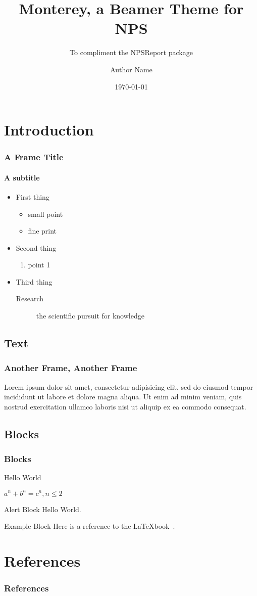 \documentclass{beamer}
\title{Monterey, a Beamer Theme for NPS}
\subtitle{To compliment the NPSReport package}
\author{Author Name}
\date{\today}
\institute[\sc www.nps.edu]{Naval Postgraduate School}
\begin{document}
\begin{frame}[plain,t]
\titlepage
\end{frame}


\section{Introduction}
\begin{frame}
\frametitle{A Frame Title}
\framesubtitle{A subtitle}
\begin{itemize}
\item First thing
	\begin{itemize}
	\item small point
	\item fine print
	\end{itemize}
\item Second thing
	\begin{enumerate}
	\item point 1
	\end{enumerate}
\item Third thing
	\begin{description}
	\item[Research] the scientific pursuit for knowledge
	\end{description}
\end{itemize}
\end{frame}


\subsection{Text}
\begin{frame}
\frametitle{Another Frame, Another Frame}
Lorem ipsum dolor sit amet, consectetur adipisicing elit, sed do eiusmod tempor incididunt ut labore et dolore magna aliqua. Ut enim ad minim veniam, quis nostrud exercitation ullamco laboris nisi ut aliquip ex ea commodo consequat.
\end{frame}



\subsection{Blocks}
\begin{frame}
\frametitle{Blocks}
\begin{definition}[Greetings]
Hello World
\end{definition}

\begin{theorem}[Theorem]
$a^n + b^n = c^n, n \leq 2$
\end{theorem}

\begin{alertblock}{Alert Block}
Hello World.
\end{alertblock}

\begin{exampleblock}{Example Block}
Here is a reference to the \LaTeX book~\cite{texbook}.
\end{exampleblock}
\end{frame}


%
%
\section{References}
\begin{frame}
\frametitle{References}


\end{frame}
\end{document}
